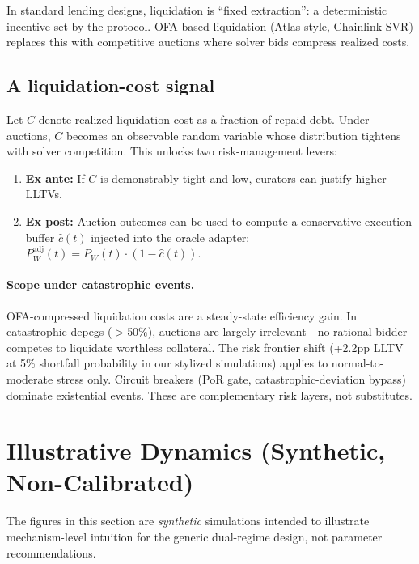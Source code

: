 \documentclass[11pt]{article}
\begin{document}
In standard lending designs, liquidation is ``fixed extraction'': a deterministic incentive set by the protocol. OFA-based liquidation (Atlas-style, Chainlink SVR) replaces this with competitive auctions where solver bids compress realized costs.

\subsection{A liquidation-cost signal}

Let $C$ denote realized liquidation cost as a fraction of repaid debt. Under auctions, $C$ becomes an observable random variable whose distribution tightens with solver competition. This unlocks two risk-management levers:
\begin{enumerate}[leftmargin=*]
\item \textbf{Ex ante:} If $C$ is demonstrably tight and low, curators can justify higher LLTVs.
\item \textbf{Ex post:} Auction outcomes can be used to compute a conservative execution buffer $\hat{c}(t)$ injected into the oracle adapter: $P_W^{\text{adj}}(t) = P_W(t)\cdot(1-\hat{c}(t))$.
\end{enumerate}

\paragraph{Scope under catastrophic events.} OFA-compressed liquidation costs are a steady-state efficiency gain. In catastrophic depegs ($>$50\%), auctions are largely irrelevant---no rational bidder competes to liquidate worthless collateral. The risk frontier shift (+2.2pp LLTV at 5\% shortfall probability in our stylized simulations) applies to normal-to-moderate stress only. Circuit breakers (PoR gate, catastrophic-deviation bypass) dominate existential events. These are complementary risk layers, not substitutes.

\section{Illustrative Dynamics (Synthetic, Non-Calibrated)}
\label{sec:illustrative}

The figures in this section are \emph{synthetic} simulations intended to illustrate mechanism-level intuition for the generic dual-regime design, not parameter recommendations.
\end{document}
